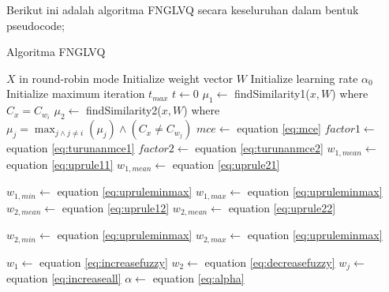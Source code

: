 \clearpage

\noindent Berikut ini adalah algoritma FNGLVQ secara keseluruhan dalam bentuk
pseudocode;

\begin{algorithm}  
\scriptsize 
\caption{Algoritma FNGLVQ}          
\label{alg:fnglvq}                           
\begin{algorithmic}                    %
	\REQUIRE $X$ in round-robin mode
	\STATE Initialize weight vector $W$
	\STATE Initialize learning rate $\alpha_0$
	\STATE Initialize maximum iteration $t_{max}$
	\STATE $t \leftarrow 0$
			\STATE $\mu_1 \leftarrow $ findSimilarity1($x, W$) where $C_x = C_{w_i}$
			\STATE $\mu_2 \leftarrow $ findSimilarity2($x, W$) where $\mu_j = \max_{j
			\wedge j \neq i}(\mu_j) \wedge (C_x \neq C_{w_j})$
				\STATE $mce \leftarrow $ equation \ref{eq:mce}
				\STATE $factor1 \leftarrow $ equation \ref{eq:turunanmce1}
				\STATE $factor2 \leftarrow $ equation \ref{eq:turunanmce2}
				\STATE
				\STATE {}
					\STATE $w_{1,mean} \leftarrow $ equation \ref{eq:uprule11}
					\STATE $w_{1,mean} \leftarrow $ equation \ref{eq:uprule21}
				\ENDIF
	
				\STATE $w_{1,min} \leftarrow $ equation \ref{eq:upruleminmax}
				\STATE $w_{1,max} \leftarrow $ equation \ref{eq:upruleminmax}
				\STATE
				\STATE {}
					\STATE $w_{2,mean} \leftarrow $ equation \ref{eq:uprule12}
					\STATE $w_{2,mean} \leftarrow $ equation \ref{eq:uprule22}
				\ENDIF
	
				\STATE $w_{2,min} \leftarrow $ equation \ref{eq:upruleminmax}
				\STATE $w_{2,max} \leftarrow $ equation \ref{eq:upruleminmax}
	
				\STATE
					\STATE {}
					\STATE $w_1 \leftarrow$ equation \ref{eq:increasefuzzy}
				\ELSE
					\STATE {}
					\STATE $w_2 \leftarrow$  equation \ref{eq:decreasefuzzy}
				\ENDIF
			\ELSE
				\STATE {}
					\STATE $w_j \leftarrow $ equation \ref{eq:increaseall}
				\ENDFOR
			\ENDIF
		\ENDFOR
	\ENDWHILE
	\STATE $\alpha \leftarrow $ equation \ref{eq:alpha} 
\end{algorithmic}
\end{algorithm}  

